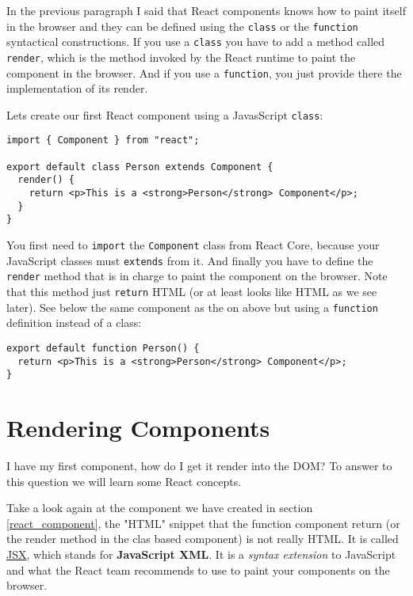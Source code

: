 \documentclass[a4paper, oneside, titlepage, 12pt]{book}
\begin{document}
In the previous paragraph I said that React components knows how to paint itself in the browser and they can be defined using the \texttt{class} or the \texttt{function} syntactical constructions. If you use a \texttt{class} you have to add a method called \texttt{render}, which is the method invoked by the React runtime to paint the component in the browser. And if you use a \texttt{function}, you just provide there the implementation of its render.

Lets create our first React component using a JavasScript \texttt{class}:

\begin{verbatim}
import { Component } from "react";

export default class Person extends Component {
  render() {
    return <p>This is a <strong>Person</strong> Component</p>;
  }
}
\end{verbatim}

You first need to \texttt{import} the \texttt{Component} class from React Core, because your JavaScript classes must \texttt{extends} from it. And finally you have to define the \texttt{render} method that is in charge to paint the component on the browser. Note that this method just \texttt{return} HTML (or at least looks like HTML as we see later). See below the same component as the on above but using a \texttt{function} definition instead of a class:

\begin{verbatim}
export default function Person() {
  return <p>This is a <strong>Person</strong> Component</p>;
}
\end{verbatim}

\section{Rendering Components}

I have my first component, how do I get it render into the DOM? To answer to this question we will learn some React concepts.

Take a look again at the component we have created in section \ref{react_component}, the "HTML" snippet that the function component return (or the render method in the clas based component) is not really HTML. It is called \href{https://reactjs.org/docs/introducing-jsx.html}{JSX}, which stands for \textbf{JavaScript XML}. It is a \textit{syntax extension} to JavaScript and what the React team recommends to use to paint your components on the browser.
\newline 
\end{document}

